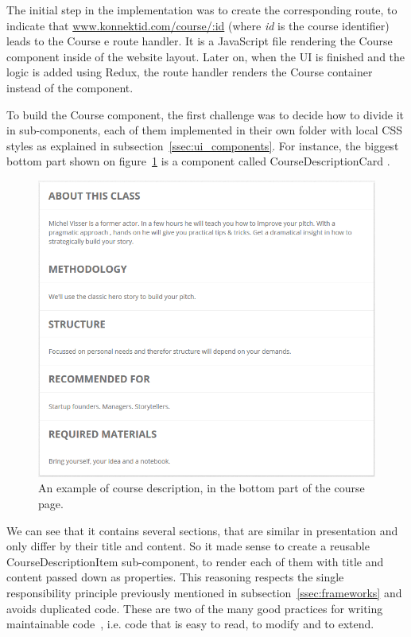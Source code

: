 The initial step in the implementation was to create the corresponding route, to indicate that \url{www.konnektid.com/course/:id} (where \textit{id} is the course identifier) leads to the \guillemotleft{} Course \guillemotright{}e route handler. It is a JavaScript file rendering the Course component inside of the website layout. Later on, when the UI is finished and the logic is added using Redux, the route handler renders the Course container instead of the component.

To build the Course component, the first challenge was to decide how to divide it in sub-components, each of them implemented in their own folder with local CSS styles as explained in {\sc subsection}~\ref{ssec:ui_components}. For instance, the biggest bottom part shown on {\sc figure}~\ref{fig:courseDescription} is a component called \guillemotleft{} CourseDescriptionCard \guillemotright{}.

\begin{figure}[H]
    \centering
    \includegraphics[scale=0.6]{figure/courseDescription.png}
    \caption{An example of course description, in the bottom part of the course page.}
    \label{fig:courseDescription}
\end{figure} 

We can see that it contains several sections, that are similar in presentation and only differ by their title and content. So
it made sense to create a reusable \guillemotleft{} CourseDescriptionItem \guillemotright{} sub-component, to render each of them with title and content passed down as properties. This reasoning respects the single responsibility principle previously mentioned in {\sc subsection}~\ref{ssec:frameworks} and avoids duplicated code.
These are two of the many good practices for writing maintainable code~\cite{maintainable}, i.e. code that is easy to read, to modify and to extend.

